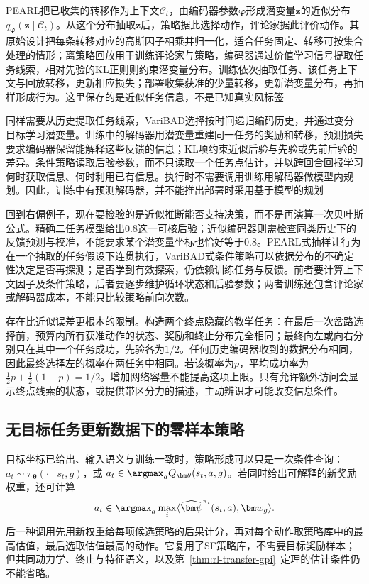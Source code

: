 PEARL把已收集的转移作为上下文$\mathcal C_t$，由编码器参数$\bm\varphi$形成潜变量$\bm z$的近似分布$q_{\bm\varphi}(\bm z\mid\mathcal C_t)$。从这个分布抽取$\bm z$后，策略据此选择动作，评论家据此评价动作。其原始设计把每条转移对应的高斯因子相乘并归一化，适合任务固定、转移可按集合处理的情形；离策略回放用于训练评论家与策略，编码器通过价值学习信号提取任务线索，相对先验的KL正则则约束潜变量分布。训练依次抽取任务、该任务上下文与回放转移，更新相应损失；部署收集获准的少量转移，更新潜变量分布，再抽样形成行为。这里保存的是近似任务信息，不是已知真实风标签

同样需要从历史提取任务线索，VariBAD选择按时间递归编码历史，并通过变分目标学习潜变量。训练中的解码器用潜变量重建同一任务的奖励和转移，预测损失要求编码器保留能解释这些反馈的信息；KL项约束近似后验与先验或先前后验的差异。条件策略读取后验参数，而不只读取一个任务点估计，并以跨回合回报学习何时获取信息、何时利用已有信息。执行时不需要调用训练用解码器做模型内规划。因此，训练中有预测解码器，并不能推出部署时采用基于模型的规划

回到右偏例子，现在要检验的是近似推断能否支持决策，而不是再演算一次贝叶斯公式。精确二任务模型给出$0.8$这一可核后验；近似编码器则需检查同类历史下的反馈预测与校准，不能要求某个潜变量坐标也恰好等于$0.8$。PEARL式抽样让行为在一个抽取的任务假设下连贯执行，VariBAD式条件策略可以依据分布的不确定性决定是否再探测；是否学到有效探索，仍依赖训练任务与反馈。前者要计算上下文因子及条件策略，后者要逐步维护循环状态和后验参数；两者训练还包含评论家或解码器成本，不能只比较策略前向次数。

存在比近似误差更根本的限制。构造两个终点隐藏的教学任务：在最后一次岔路选择前，预算内所有获准动作的状态、奖励和终止分布完全相同；最终向左或向右分别只在其中一个任务成功，先验各为$1/2$。任何历史编码器收到的数据分布相同，因此最终选择左的概率在两任务中相同。若该概率为$p$，平均成功率为$\tfrac12p+\tfrac12(1-p)=1/2$。增加网络容量不能提高这项上限。只有允许额外访问会显示终点线索的状态，或提供带区分力的描述，主动辨识才可能改变信息条件。

\subsection{无目标任务更新数据下的零样本策略}
\label{sec:rl-transfer-zero-shot}

目标坐标已给出、输入语义与训练一致时，策略形成可以只是一次条件查询：
$a_t\sim\pi_{\bm\theta}(\cdot\mid s_t,g)$，或
$a_t\in\argmax_a Q_{\bm\theta}(s_t,a,g)$。若同时给出可解释的新奖励权重，还可计算
\[
 a_t\in\argmax_a\max_i
 \langle\widehat{\bm\psi}^{\pi_i}(s_t,a),\bm w_g\rangle.
\]
后一种调用先用新权重给每项候选策略的后果计分，再对每个动作取策略库中的最高估值，最后选取估值最高的动作。它复用了SF策略库，不需要目标奖励样本；但共同动力学、终止与特征语义，以及第~\ref{thm:rl-transfer-gpi}~定理的估计条件仍不能省略。

